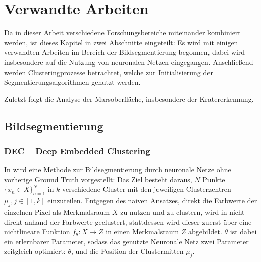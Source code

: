 \chapter{Verwandte Arbeiten}
\label{chap:related}

Da in dieser Arbeit verschiedene Forschungsbereiche miteinander kombiniert werden, ist dieses Kapitel in zwei Abschnitte eingeteilt: Es wird mit einigen verwandten Arbeiten im Bereich der Bildsegmentierung begonnen, dabei wird insbesondere auf die Nutzung von neuronalen Netzen eingegangen. Anschließend werden Clusteringprozesse betrachtet, welche zur Initialisierung der Segmentierungsalgorithmen genutzt werden. 

Zuletzt folgt die Analyse der Marsoberfläche, insbesondere der Kratererkennung.

\section{Bildsegmentierung}
\label{sec:image_segmentation}

\subsection{DEC -- Deep Embedded Clustering}
\label{ssec:dec}
In \cite{junyuan_16} wird eine Methode zur Bildsegmentierung durch neuronale Netze ohne vorherige Ground Truth vorgestellt: Das Ziel besteht daraus, $N$ Punkte $\{x_n\in X\}_{n=1}^N$ in $k$ verschiedene Cluster mit den jeweiligen Clusterzentren $\mu_j, j\in\left[1, k\right]$ einzuteilen. Entgegen des naiven Ansatzes, direkt die Farbwerte der einzelnen Pixel als Merkmalsraum $X$ zu nutzen und zu clustern, wird in \cite{junyuan_16} nicht direkt anhand der Farbwerte geclustert, stattdessen wird dieser zuerst über eine nichtlineare Funktion $f_\theta: X\rightarrow Z$ in einen Merkmalsraum $Z$ abgebildet. $\theta$ ist dabei ein erlernbarer Parameter, sodass das genutzte Neuronale Netz zwei Parameter zeitgleich optimiert: $\theta$, und die Position der Clustermitten $\mu_j$.

